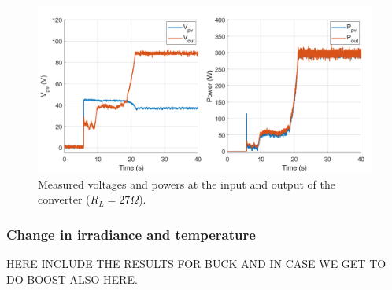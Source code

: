 \begin{figure}[H]
	\begin{center}
		\includegraphics[width=1\textwidth]{../Pictures/P1/Test/Boost_mode_MPPT_Vin_Vout_Iin_Pin_Pout}
		\caption{Measured voltages and powers at the input and output of the converter ($R_{L}=27\Omega$).}
		\label{MPPTtestboostmode2}
	\end{center}	
\end{figure}



\subsubsection*{Change in irradiance and temperature}

HERE INCLUDE THE RESULTS FOR BUCK AND IN CASE WE GET TO DO BOOST ALSO HERE. 
